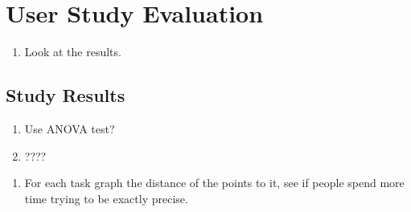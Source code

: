 \section{User Study Evaluation}
\begin{enumerate}
	\item Look at the results.
\end{enumerate}

\subsection{Study Results}
\begin{enumerate}
	\item Use ANOVA test?
	\item ????
\end{enumerate}

\begin{enumerate}
	\item For each task graph the distance of the points to it, see if people spend more time trying to be exactly precise.
\end{enumerate}